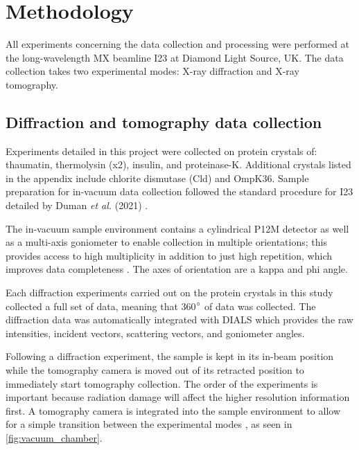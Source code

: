 \section{Methodology}\label{sec:methodology}

All experiments concerning the data collection and processing were performed at the long-wavelength MX beamline I23 at Diamond Light Source, UK. The data collection takes two experimental modes: X-ray diffraction and X-ray tomography. %

\subsection{Diffraction and tomography data collection}

Experiments detailed in this project were collected on protein crystals of: thaumatin, thermolysin (x2), insulin, and proteinase-K. Additional crystals listed in the appendix include chlorite dismutase (Cld) and OmpK36.
Sample preparation for in-vacuum data collection followed the standard procedure for I23 detailed by Duman \textit{et al.} (2021) \cite{Duman2021}.

The in-vacuum sample environment contains a cylindrical P12M detector as well as a multi-axis goniometer to enable collection  in multiple orientations; this provides access to high multiplicity in addition to just high repetition, which improves data completeness \cite{Finke2016}. The axes of orientation are a kappa and phi angle. %

Each diffraction experiments carried out on the protein crystals in this study collected a full set of data, meaning that 360$\degree$ of data was collected. The diffraction data was automatically integrated with DIALS which provides the raw intensities, incident vectors, scattering vectors, and goniometer angles.

Following a diffraction experiment, the sample is kept in its in-beam position while the tomography camera is moved out of its retracted position to immediately start tomography collection. The order of the experiments is important because radiation damage will affect the higher resolution information first. A tomography camera is integrated into the sample environment to allow for a simple transition between the experimental modes \cite{Kazantsev2021}, as seen in \cref{fig:vacuum_chamber}.

